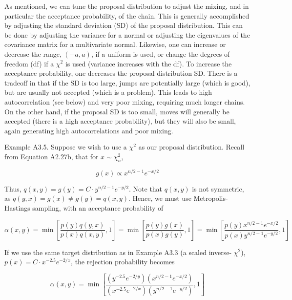 \documentclass{article}
\begin{document}
As mentioned, we can tune the proposal distribution to adjust the mixing, and in particular the acceptance probability, of the chain. This is generally accomplished by adjusting the standard deviation (SD) of the proposal distribution. This can be done by adjusting the variance for a normal or adjusting the eigenvalues of the covariance matrix for a multivariate normal. Likewise, one can increase or decrease the range,  $ (-a, a) $, if a uniform is used, or change the degrees of freedom (df) if a  $ \chi^{2} $ is used (variance increases with the df). To increase the acceptance probability, one decreases the proposal distribution SD. There is a tradeoff in that if the SD is too large, jumps are potentially large (which is good), but are usually not accepted (which is a problem). This leads to high autocorrelation (see below) and very poor mixing, requiring much longer chains. On the other hand, if the proposal SD is too small, moves will generally be accepted (there is a high acceptance probability), but they will also be small, again generating high autocorrelations and poor mixing.

Example A3.5. Suppose we wish to use a  $ \chi^2 $ as our proposal distribution. Recall from Equation A2.27b, that for  $ x \sim \chi_n^2 $,

\begin{equation}
g(x)\propto x^{n/2-1}e^{-x/2}
\end{equation}

Thus,  $  q(x, y) = g(y) = C \cdot y^{n/2-1} e^{-y/2}  $. Note that  $  q(x, y)  $ is not symmetric, as  $  q(y, x) = g(x) \neq g(y) = q(x, y)  $. Hence, we must use Metropolis-Hastings sampling, with an acceptance probability of

\begin{equation}
\alpha(x,y)=\min\left[\frac{p(y)q(y,x)}{p(x)q(x,y)},1\right]=\min\left[\frac{p(y)g(x)}{p(x)g(y)},1\right]=\min\left[\frac{p(y)x^{n/2-1}e^{-x/2}}{p(x)y^{n/2-1}e^{-y/2}},1\right]
\end{equation}

If we use the same target distribution as in Example A3.3 (a scaled inverse- $ \chi^2 $),  $ p(x) = C \cdot x^{-2.5} e^{-2/x} $, the rejection probability becomes

\begin{equation}
\alpha(x,y)=\min\left[\frac{\left(y^{-2.5}e^{-2/y}\right)\left(x^{n/2-1}e^{-x/2}\right)}{\left(x^{-2.5}e^{-2/x}\right)\left(y^{n/2-1}e^{-y/2}\right)},1\right]
\end{equation}
\end{document}
